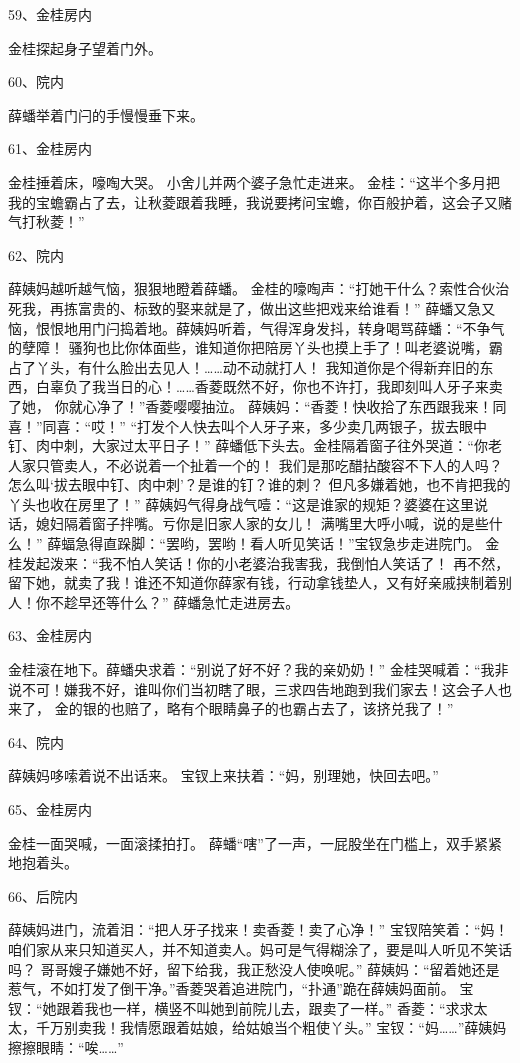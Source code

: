 59、金桂房内\par
金桂探起身子望着门外。

60、院内\par
薛蟠举着门闩的手慢慢垂下来。

61、金桂房内\par
金桂捶着床，嚎啕大哭。
小舍儿并两个婆子急忙走进来。
金桂：“这半个多月把我的宝蟾霸占了去，让秋菱跟着我睡，我说要拷问宝蟾，你百般护着，这会子又赌气打秋菱！”

62、院内\par
薛姨妈越听越气恼，狠狠地瞪着薛蟠。
金桂的嚎啕声：“打她干什么？索性合伙治死我，再拣富贵的、标致的娶来就是了，做出这些把戏来给谁看！”
薛蟠又急又恼，恨恨地用门闩捣着地。薛姨妈听着，气得浑身发抖，转身喝骂薛蟠：“不争气的孽障！
骚狗也比你体面些，谁知道你把陪房丫头也摸上手了！叫老婆说嘴，霸占了丫头，有什么脸出去见人！……动不动就打人！
我知道你是个得新弃旧的东西，白辜负了我当日的心！……香菱既然不好，你也不许打，我即刻叫人牙子来卖了她，
你就心净了！”香菱嘤嘤抽泣。
薛姨妈：“香菱！快收拾了东西跟我来！同喜！”同喜：“哎！”
“打发个人快去叫个人牙子来，多少卖几两银子，拔去眼中钉、肉中刺，大家过太平日子！”
薛蟠低下头去。金桂隔着窗子往外哭道：“你老人家只管卖人，不必说着一个扯着一个的！
我们是那吃醋拈酸容不下人的人吗？怎么叫‘拔去眼中钉、肉中刺’？是谁的钉？谁的刺？
但凡多嫌着她，也不肯把我的丫头也收在房里了！”
薛姨妈气得身战气噎：“这是谁家的规矩？婆婆在这里说话，媳妇隔着窗子拌嘴。亏你是旧家人家的女儿！
满嘴里大呼小喊，说的是些什么！”
薛蝠急得直跺脚：“罢哟，罢哟！看人听见笑话！”宝钗急步走进院门。
金桂发起泼来：“我不怕人笑话！你的小老婆治我害我，我倒怕人笑话了！
再不然，留下她，就卖了我！谁还不知道你薛家有钱，行动拿钱垫人，又有好亲戚挟制着别人！你不趁早还等什么？”
薛蟠急忙走进房去。

63、金桂房内\par
金桂滚在地下。薛蟠央求着：“别说了好不好？我的亲奶奶！”
金桂哭喊着：“我非说不可！嫌我不好，谁叫你们当初瞎了眼，三求四告地跑到我们家去！这会子人也来了，
金的银的也赔了，略有个眼睛鼻子的也霸占去了，该挤兑我了！”

64、院内\par
薛姨妈哆嗦着说不出话来。
宝钗上来扶着：“妈，别理她，快回去吧。”

65、金桂房内\par
金桂一面哭喊，一面滚揉拍打。
薛蟠“嗐”了一声，一屁股坐在门槛上，双手紧紧地抱着头。

66、后院内\par
薛姨妈进门，流着泪：“把人牙子找来！卖香菱！卖了心净！”
宝钗陪笑着：“妈！咱们家从来只知道买人，并不知道卖人。妈可是气得糊涂了，要是叫人听见不笑话吗？
哥哥嫂子嫌她不好，留下给我，我正愁没人使唤呢。”
薛姨妈：“留着她还是惹气，不如打发了倒干净。”香菱哭着追进院门，“扑通”跪在薛姨妈面前。
宝钗：“她跟着我也一样，横竖不叫她到前院儿去，跟卖了一样。”
香菱：“求求太太，千万别卖我！我情愿跟着姑娘，给姑娘当个粗使丫头。”
宝钗：“妈……”薛姨妈擦擦眼睛：“唉……”


